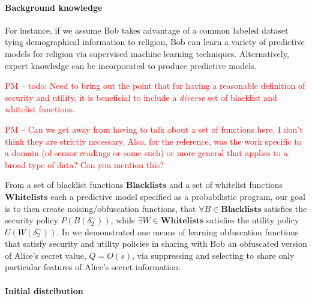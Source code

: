 \documentclass{article} %
\newcommand{\pxm}[1]{\textcolor{red}{PM -- #1}}
\newcommand{\blacklists}[0]{\textbf{Blacklists}}
\newcommand{\whitelists}[0]{\textbf{Whitelists}}
\theoremstyle{plain} %
\theoremstyle{definition} %
\begin{document}
\paragraph*{Background knowledge} 

For instance, if we assume Bob takes advantage of a common labeled
dataset tying demographical information to religion, Bob can learn a
variety of predictive models for religion via supervised machine
learning techniques. Alternatively, expert knowledge can be
incorporated to produce predictive models.


\pxm{todo: Need to bring out the point that for  having a reasonable
definition of security and utility, it is beneficial to include a
\emph{diverse} set of blacklist and whitelist functions.}

\pxm{Can we get away from having to talk about a set of functions
  here, I don't think they are strictly necessary. Also, for the
  reference, was the work specific to a domain (of sensor readings or
  some such) or more general that applies to a broad type of data?
  Can you mention this?}

From a set of blacklist functions $\blacklists$ and a set of whitelist
functions $\whitelists$ each a predictive model specified as a
probabilistic program, our goal is to then create noising/obfuscation
functions, that $ \forall B \in \blacklists $ satisfies the security
policy $ P(B(\delta_2^\sim)) $, while $ \exists W \in \whitelists $
satisfies the utility policy $ U(W(\delta_2^\sim)) $.  In
\cite{chakraborty12balancing} we demonstrated one means of learning
obfuscation functions that satisfy security and utility policies in
sharing with Bob an obfuscated version of Alice's secret value, $ Q =
O(s) $, via suppressing and selecting to share only particular
features of Alice's secret information.

\paragraph*{Initial distribution}
\end{document}
